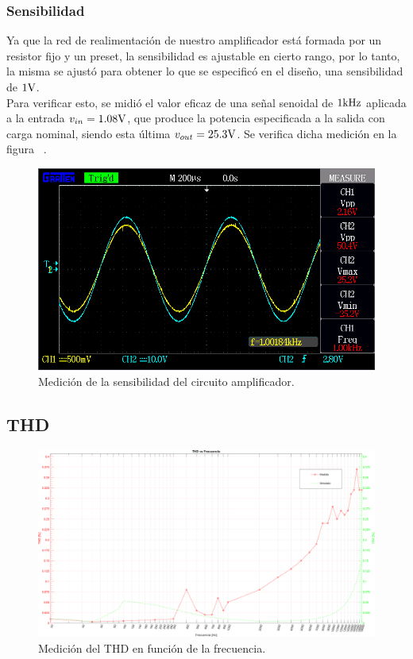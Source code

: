 \subsubsection{Sensibilidad}

Ya que la red de realimentación de nuestro amplificador está formada por un resistor fijo y un preset, la sensibilidad es ajustable en cierto rango, por lo tanto, la misma se ajustó para obtener lo que se especificó en el diseño, una sensibilidad de $1 \si[per-mode=symbol]{\volt}$. \\
Para verificar esto, se midió el valor eficaz de una señal senoidal de $1 \si[per-mode=symbol]{\kilo\hertz}$ aplicada a la entrada $v_{in}=1.08 \si[per-mode=symbol]{\volt}$, que produce la potencia especificada a la salida con carga nominal, siendo esta última $v_{out}= 25.3 \si[per-mode=symbol]{\volt}$. Se verifica dicha medición en la figura ~.

\begin{figure}[H]
    \centering
    \includegraphics[width=0.95 \textwidth]{./img/mediciones/Sensitivity/1.png}
    \caption{Medición de la sensibilidad del circuito amplificador.}
    \label{fig:Sensitivity}
\end{figure}


\subsection{THD}

\begin{figure}[H]
    \centering
    \includegraphics[width=0.95 \textwidth, angle=90]{img/mediciones/THD/THD_vs_frequency.png}
    \caption{Medición del THD en función de la frecuencia.}
    \label{fig:Sensitivity}
\end{figure}

